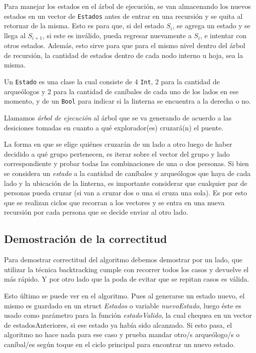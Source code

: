             Para manejar los estados en el árbol de ejecución, se van almacenando los nuevos estados en un vector de \texttt{Estados} antes de entrar en una recursión y se quita al retornar de la misma. Esto es para que, si del estado $S_{i}$, se agrega un estado y se llega al $S_{i+1}$, si este es inválido, pueda regresar nuevamente a $S_{i}$, e intentar con otros estados. Además, esto sirve para que para el mismo nivel dentro del árbol de recursión, la cantidad de estados dentro de cada nodo interno u hoja, sea la misma.

            Un \texttt{Estado} es una clase la cual consiste de 4 \texttt{Int}, 2 para la cantidad de arqueólogos y 2 para la cantidad de caníbales de cada uno de los lados en ese momento, y de un \texttt{Bool} para indicar si la linterna se encuentra a la derecha o no.

            Llamamos \emph{árbol de ejecución} al árbol que se va generando de acuerdo a las desiciones tomadas en cuanto a qué explorador(es) cruzará(n) el puente.

            La forma en que se elige quiénes cruzarán de un lado a otro luego de haber decidido a qué grupo pertenecen, es iterar sobre el vector del grupo y lado correspondiente y probar todas las combinaciones de una o dos personas. Si bien se considera un \emph{estado} a la cantidad de caníbales y arqueólogos que haya de cada lado y la ubicación de la linterna, es importante considerar que cualquier par de personas pueda cruzar (si van a cruzar dos o una si cruza una sola). Es por esto que se realizan ciclos que recorran a los vectores y se entra en una nueva recursión por cada persona que se decide enviar al otro lado.


    \subsection{Demostración de la correctitud}
      Para demostrar correctitud del algoritmo debemos demostrar por un lado, que utilizar la técnica backtracking cumple con recorrer todos los casos y devuelve el más rápido. Y por otro lado que la poda de evitar que se repitan casos es válida.
      \par Esto último se puede ver en el algoritmo. Pues al generarse un estado nuevo, el mismo es guardado en un struct \emph{Estados} o variable \emph{nuevoEstado}, luego éste es usado como parámetro para la función \emph{estadoValido}, la cual chequea en un vector de estadosAnteriores, si ese estado ya había sido alcanzado. Si esto pasa, el algoritmo no hace nada para ese caso y prueba mandar otro/s arqueólogo/s o caníbal/es según toque en el ciclo principal para encontrar un nuevo estado.

